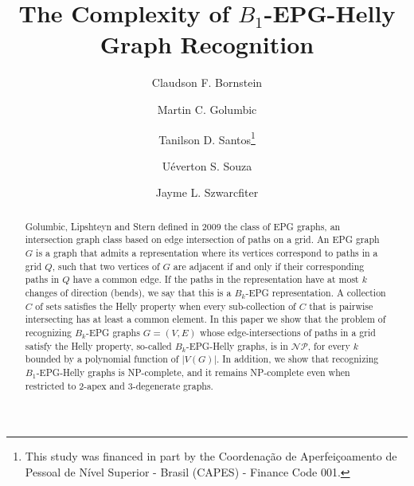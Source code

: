 \documentclass[runningheads]{llncs}
\begin{document}
%
\title{The Complexity of $B_{1}$-EPG-Helly Graph Recognition}
%
%
\author{Claudson F.  Bornstein \and
Martin C. Golumbic  \and
Tanilson D. Santos\thanks{This study was financed in part by the Coordena{\c c}\~ao de Aperfei{\c c}oamento de Pessoal de N\'ivel Superior - Brasil (CAPES) - Finance Code 001.} \and 
U\'everton S. Souza \and
Jayme L.  Szwarcfiter
}
%
%

%
\maketitle              %
%
\begin{abstract}

Golumbic, Lipshteyn and Stern defined in 2009 the class of EPG graphs, an intersection graph class  based on edge intersection of paths on a grid. An EPG graph $G$ is a graph that admits a representation where its vertices correspond to paths in a grid $Q$, such that two vertices of $G$ are adjacent if and only if their corresponding paths in $Q$ have a common edge. If the paths in the representation have at most $k$ changes of direction  (bends), we say that this is a  $B_k$-EPG representation. A collection $C$ of sets satisfies the Helly property when every sub-collection of $C$ that is pairwise intersecting has at least a common element. 
In this paper we show that the problem of recognizing $B_k$-EPG graphs $G=(V,E)$ whose edge-intersections of paths in a grid satisfy the Helly property, so-called $B_k$-EPG-Helly graphs, is in $\mathcal{NP}$, for every $k$ bounded by a polynomial function of $|V(G)|$. In addition, we show that recognizing $B_1$-EPG-Helly graphs is NP-complete, and it remains NP-complete even when restricted to 2-apex and 3-degenerate graphs.

\end{abstract}
%
%
%
\end{document}
